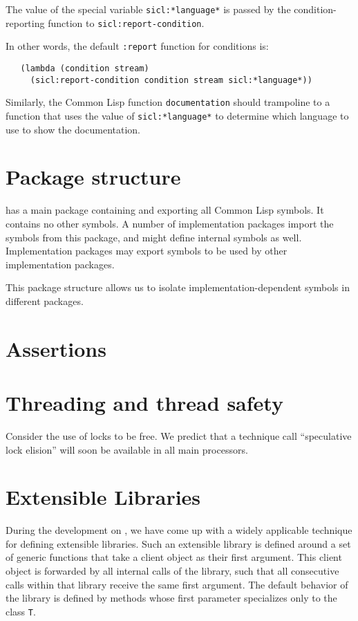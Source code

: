 The value of the special variable \texttt{sicl:*language*} is passed
by the condition-reporting function to \texttt{sicl:report-condition}.

In other words, the default \texttt{:report} function for conditions is:

\begin{verbatim}
   (lambda (condition stream)
     (sicl:report-condition condition stream sicl:*language*))
\end{verbatim}

Similarly, the Common Lisp function \texttt{documentation} should
trampoline to a function that uses the value of
\texttt{sicl:*language*} to determine which language to use to show
the documentation.

\section{Package structure}

{\sysname} has a main package containing and exporting all Common Lisp
symbols.  It contains no other symbols.  A number of implementation
packages import the symbols from this package, and might define
internal symbols as well.  Implementation packages may export symbols
to be used by other implementation packages.

This package structure allows us to isolate implementation-dependent
symbols in different packages.

\section{Assertions}

\section{Threading and thread safety}

Consider the use of locks to be free.  We predict that a technique
call ``speculative lock elision'' will soon be available in all main
processors.

\section{Extensible Libraries}

During the development on \sysname{}, we have come up with a
widely applicable technique for defining extensible libraries.  Such an
extensible library is defined around a set of generic functions that take a
client object as their first argument.  This client object is forwarded by
all internal calls of the library, such that all consecutive calls within
that library receive the same first argument.  The default behavior of the
library is defined by methods whose first parameter specializes only to the
class \texttt{T}.

